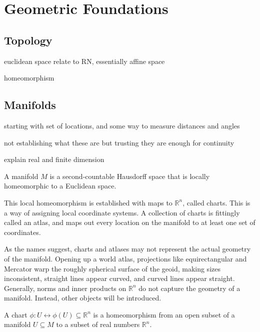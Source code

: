 \chapter{Geometric Foundations}
\label{chapter:Geometric-Foundations}


\section{Topology}

euclidean space relate to RN, essentially affine space

homeomorphism

\section{Manifolds}

starting with set of locations, and some way to measure distances and angles

not establishing what these are but trusting they are enough for continuity

explain real and finite dimension

\begin{definition}[Manifold]
	A manifold $M$ is a second-countable Hausdorff space that is locally homeomorphic to a Euclidean space.
\end{definition}

This local homeomorphism is established with maps to $\mathbb{R}^{n}$, called charts. This is a way of assigning local coordinate systems. A collection of charts is fittingly called an atlas, and maps out every location on the manifold to at least one set of coordinates.

As the names suggest, charts and atlases may not represent the actual geometry of the manifold. Opening up a world atlas, projections like equirectangular and Mercator warp the roughly spherical surface of the geoid, making sizes inconsistent, straight lines appear curved, and curved lines appear straight. Generally, norms and inner products on $\mathbb{R}^{n}$ do not capture the geometry of a manifold. Instead, other objects will be introduced.

\begin{definition}[Chart]
	A chart $\phi: U \leftrightarrow \phi(U) \subseteq \mathbb{R}^{n}$ is a homeomorphism from an open subset of a manifold $U \subseteq M$ to a subset of real numbers $\mathbb{R}^{n}$.
\end{definition}

